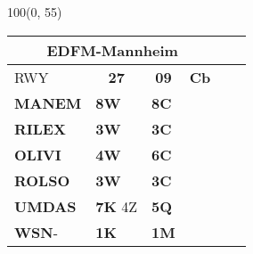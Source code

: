 \documentclass[10pt,landscape,a4paper]{article}
\begin{document}
\begin{textblock}{100}(0, 55)
\begin{table}[]
\begin{tabular}{|llllll}
\multicolumn{4}{c}{\textbf{EDFM-Mannheim}} \\ \hline
\multicolumn{1}{|l|}{RWY} 									& \multicolumn{1}{c|}{\textbf{27}} 			& \multicolumn{1}{c|}{\textbf{09}}  				& \multicolumn{1}{c|}{\textbf{Cb}} 							\\ \hline
\multicolumn{1}{|l|}{\textbf{MANEM}}							& \multicolumn{1}{l|}{\textbf{8W} }			& \multicolumn{1}{l|}{\textbf{8C}} 				& \multicolumn{1}{c|}{\multirow{6}{*}{\rotatebox{90}{5000ft}}}			\\ \cline{1-3}
\multicolumn{1}{|l|}{\textbf{RILEX}}							& \multicolumn{1}{l|}{\textbf{3W}}			& \multicolumn{1}{l|}{\textbf{3C} }				& \multicolumn{1}{c|}{}  								\\ \cline{1-3}

\multicolumn{1}{|l|}{\textbf{OLIVI}} 							& \multicolumn{1}{l|}{\textbf{4W}} 			& \multicolumn{1}{l|}{\textbf{6C}}				& \multicolumn{1}{c|}{} 									\\ \cline{1-3}
\multicolumn{1}{|l|}{\textbf{ROLSO}}							& \multicolumn{1}{l|}{\textbf{3W}}			& \multicolumn{1}{l|}{\textbf{3C}}				& \multicolumn{1}{c|}{} 										\\ \cline{1-3} 

\multicolumn{1}{|l|}{\textbf{UMDAS}} 						& \multicolumn{1}{l|}{\textbf{7K} 4Z}			& \multicolumn{1}{l|}{\textbf{5Q}}				& \multicolumn{1}{c|}{}								 	\\\cline{1-3}
\multicolumn{1}{|l|}{\textbf{WSN}- } 						& \multicolumn{1}{l|}{\textbf{1K}} 			& \multicolumn{1}{l|}{\textbf{1M}}				& \multicolumn{1}{c|}{}  								 \\ \hline
\end{tabular}
\end{table}
\end{textblock}
\end{document}
